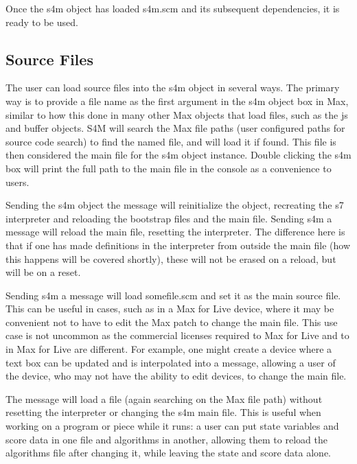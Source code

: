 \documentclass[letterpaper,10pt,english]{sphinxmanual}
\begin{document}
\sphinxAtStartPar
Once the s4m object has loaded s4m.scm and its subsequent dependencies, it is ready to be used.


\subsection{Source Files}
\label{\detokenize{features_usage:source-files}}
\sphinxAtStartPar
The user can load source files into the s4m object in several ways.
The primary way is to provide a file name as the first argument in the s4m object box in Max, similar to how this done
in many other Max objects that load files, such as the js and buffer objects.
S4M will search the Max file paths (user configured paths for source code search) to find the named file, and will load it if found.
This file is then considered the main file for the s4m object instance.
Double clicking the s4m box will print the full path to the main file in the console as a convenience to users.

\sphinxAtStartPar
Sending the s4m object the  message will re\sphinxhyphen{}initialize the object, recreating the s7 interpreter and reloading
the bootstrap files and the main file.
Sending s4m a  message will reload the main file,  resetting the interpreter.
The difference here is that if one has made definitions in the interpreter from outside the main file (how this happens will
be covered shortly), these will not be erased on a reload, but will be on a reset.

\sphinxAtStartPar
Sending s4m a  message will load some\sphinxhyphen{}file.scm and set it as the main source file.
This can be useful in cases, such as in a Max for Live device, where it may be convenient not to have to edit the Max patch
to change the main file.
This use case is not uncommon as the commercial licenses required to  Max for Live and to  in Max for Live are different.
For example, one might create a device where a text box can be updated and is interpolated into a  message,
allowing a user of the device, who may not have the ability to edit devices, to change the main file.

\sphinxAtStartPar
The message  will load a file (again searching on the Max file path) without resetting the interpreter or
changing the s4m main file.
This is useful when working on a program or piece while it runs: a user can put state variables and score data in one file
and algorithms in another, allowing them to reload the algorithms file after changing it, while leaving the state and score data alone.
\end{document}
